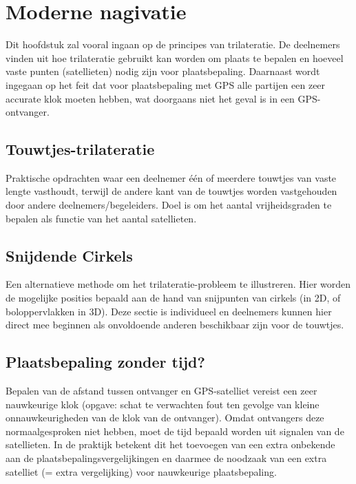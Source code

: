 \chapter{Moderne nagivatie}

Dit hoofdstuk zal vooral ingaan op de principes van trilateratie. De deelnemers vinden uit hoe trilateratie gebruikt kan worden om plaats te bepalen en hoeveel vaste punten (satellieten) nodig zijn voor plaatsbepaling. Daarnaast wordt ingegaan op het feit dat voor plaatsbepaling met GPS alle partijen een zeer accurate klok moeten hebben, wat doorgaans niet het geval is in een GPS-ontvanger.

\section{Touwtjes-trilateratie}

Praktische opdrachten waar een deelnemer \'e\'en of meerdere touwtjes van vaste lengte vasthoudt, terwijl de andere kant van de touwtjes worden vastgehouden door andere deelnemers/begeleiders. Doel is om het aantal vrijheidsgraden te bepalen als functie van het aantal satellieten.

\section{Snijdende Cirkels}

Een alternatieve methode om het trilateratie-probleem te illustreren. Hier worden de mogelijke posities bepaald aan de hand van snijpunten van cirkels (in 2D, of boloppervlakken in 3D). Deze sectie is individueel en deelnemers kunnen hier direct mee beginnen als onvoldoende anderen beschikbaar zijn voor de touwtjes.

\section{Plaatsbepaling zonder tijd?}

Bepalen van de afstand tussen ontvanger en GPS-satelliet vereist een zeer nauwkeurige klok (opgave: schat te verwachten fout ten gevolge van kleine onnauwkeurigheden van de klok van de ontvanger). Omdat ontvangers deze normaalgesproken niet hebben, moet de tijd bepaald worden uit signalen van de satellieten. In de praktijk betekent dit het toevoegen van een extra onbekende aan de plaatsbepalingsvergelijkingen en daarmee de noodzaak van een extra satelliet (= extra vergelijking) voor nauwkeurige plaatsbepaling.